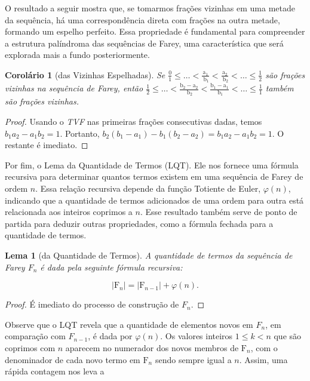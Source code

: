 \documentclass{hipatia}
\newtheorem*{lemma*}{Lema}
\newtheorem*{corollary*}{Corolário} %
\theoremstyle{definition} %
\begin{document}
O resultado a seguir mostra que, se tomarmos frações vizinhas em uma metade da sequência, há uma correspondência direta com frações na outra metade, formando um espelho perfeito. Essa propriedade é fundamental para compreender a estrutura palíndroma das sequências de Farey, uma característica que será explorada mais a fundo posteriormente.

\begin{corollary*} [das Vizinhas Espelhadas]
    Se \(\frac{0}{1} \leq \ldots<\frac{\mathrm{a}_{1}}{\mathrm{~b}_{1}}<\frac{\mathrm{a}_{2}}{\mathrm{~b}_{2}}<\ldots \leq \frac{1}{2}\) são frações vizinhas na sequência de Farey, então \(\frac{1}{2} \leq \ldots<\frac{\mathrm{b}_{2}-\mathrm{a}_{2}}{\mathrm{~b}_{2}}<\frac{\mathrm{b}_{1}-\mathrm{a}_{1}}{\mathrm{~b}_{1}}<\ldots \leq \frac{1}{1}\) também são frações vizinhas.
\end{corollary*}



\begin{proof}
Usando o \textit{TVF} nas primeiras frações consecutivas dadas, temos  
\(b_{1} a_{2} - a_{1} b_{2} = 1\).  
Portanto, \(b_{2}\left(b_{1} - a_{1}\right) - b_{1}\left(b_{2} - a_{2}\right) = b_{1} a_{2} - a_{1} b_{2} = 1\). O restante é imediato.
\end{proof}

Por fim, o Lema da Quantidade de Termos (LQT). Ele nos fornece uma fórmula recursiva para determinar quantos termos existem em uma sequência de Farey de ordem $n$. Essa relação recursiva depende da função Totiente de Euler, $\varphi(n)$, indicando que a quantidade de termos adicionados de uma ordem para outra está relacionada aos inteiros coprimos a $n$. Esse resultado também serve de ponto de partida para deduzir outras propriedades, como a fórmula fechada para a quantidade de termos.

\begin{lemma*} [da Quantidade de Termos]
    A quantidade de termos da sequência de Farey \(F_{n}\) é dada pela seguinte fórmula recursiva:

\[
\left|\mathrm{F}_{n}\right|=\left|\mathrm{F}_{n-1}\right|+\varphi(n) .
\]
\end{lemma*}

\begin{proof}
    É imediato do processo de construção de $F_n$.
\end{proof}

Observe que o LQT revela que a quantidade de elementos novos em \(F_{n}\), em comparação com \(F_{n-1}\), é dada por \(\varphi(n)\). Os valores inteiros \(1 \leq k < n\) que são coprimos com \(n\) aparecem no numerador dos novos membros de \(\mathrm{F}_{n}\), com o denominador de cada novo termo em \(\mathrm{F}_{n}\) sendo sempre igual a \(n\). Assim, uma rápida contagem nos leva a
\end{document}
